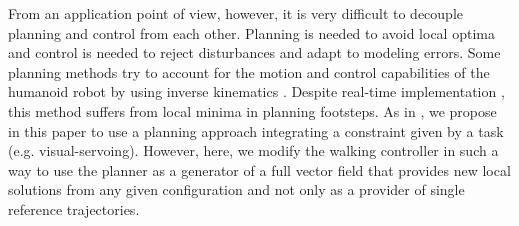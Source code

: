 From an application point of view, however, it is very difficult to decouple planning and control from each other. Planning is needed to avoid local optima and control is needed to reject disturbances and adapt to modeling errors. Some planning methods try to account for the motion and control capabilities of the humanoid robot by using inverse kinematics \citep{kanoun:ijrr:2011}. Despite real-time implementation \citep{Dang:ichr:2011}, this method suffers from local minima in planning footsteps. As in \citep{Vahrenkamp:IROS:2009}, we propose in this paper to use a planning approach integrating a constraint given by a task (e.g. visual-servoing). However, here, we modify the walking controller in such a way to use the planner as a generator of a full vector field that provides new local solutions from any given configuration and not only as a provider of single reference trajectories.
